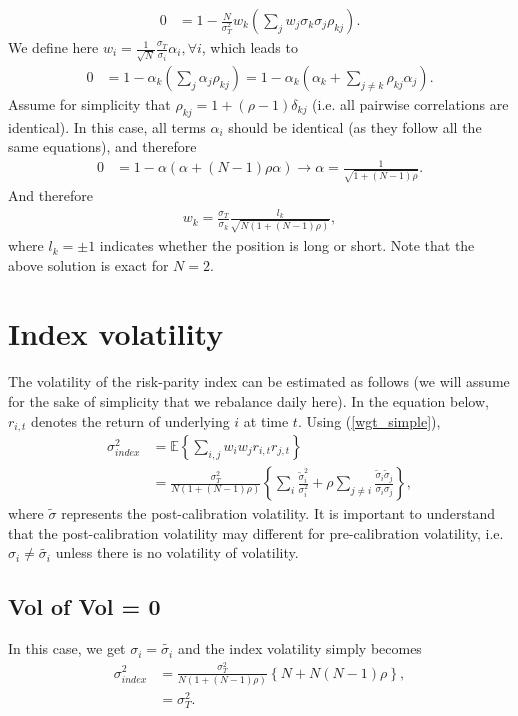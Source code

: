 \documentclass[10pt]{article}
\begin{document}
\begin{align}
0 &= 1 - \frac{N}{\sigma^2_T}w_k\left(\sum_{j}w_j\sigma_k\sigma_j\rho_{kj}\right).
\end{align}
We define here $w_i = \frac{1}{\sqrt{N}}\frac{\sigma_T}{\sigma_i}\alpha_i, \forall i$, which leads to
\begin{align}
0 &= 1 - \alpha_k\left(\sum_{j}\alpha_j\rho_{kj}\right) = 1 - \alpha_k\left(\alpha_k + \sum_{j\neq k}\rho_{kj}\alpha_j\right).
\end{align}
Assume for simplicity that $\rho_{kj} = 1 + \left(\rho - 1\right)\delta_{kj}$ (i.e. all pairwise correlations are identical). In this case, all terms $\alpha_i$ should be identical (as they follow all the same equations), and therefore
\begin{align}
0 &= 1 - \alpha\left(\alpha + (N-1)\rho\alpha\right)\rightarrow \alpha = \frac{1}{\sqrt{1+(N-1)\rho}}.
\end{align}
And therefore
\begin{align}
w_k = \frac{\sigma_T}{\sigma_k}\frac{l_k}{\sqrt{N(1+(N-1)\rho)}}, \label{wgt_simple}
\end{align}
where $l_k=\pm 1$ indicates whether the position is long or short. Note that the above solution is exact for $N = 2$.

\section{Index volatility}
The volatility of the risk-parity index can be estimated as follows (we will assume for the sake of simplicity that we rebalance daily here). In the equation below, $r_{i,t}$ denotes the return of underlying $i$ at time $t$. Using (\ref{wgt_simple}),
\begin{align}
\sigma^2_{index} &= \mathbb{E}\left\{\sum_{i,j} w_iw_jr_{i,t}r_{j,t}\right\}\\
&= \frac{\sigma^2_T}{N(1+(N-1)\rho)}\left\{\sum_{i}\frac{\tilde{\sigma}^2_i}{\sigma_i^2}+\rho\sum_{j\neq i}\frac{\tilde{\sigma}_i\tilde{\sigma}_j}{\sigma_i\sigma_j}\right\},\label{index_vol}
\end{align}
where $\tilde{\sigma}$ represents the post-calibration volatility. It is important to understand that the post-calibration volatility may different for pre-calibration volatility, i.e. $\sigma_i \neq \tilde{\sigma_i}$ unless there is no volatility of volatility.

\subsection{Vol of Vol = 0}
In this case, we get $\sigma_i = \tilde{\sigma_i}$ and the index volatility simply becomes
\begin{align}
\sigma^2_{index} &= \frac{\sigma^2_T}{N(1+(N-1)\rho)}\left\{N+N(N -1)\rho\right\},\\
 &= \sigma^2_T.
\end{align}
\end{document}
